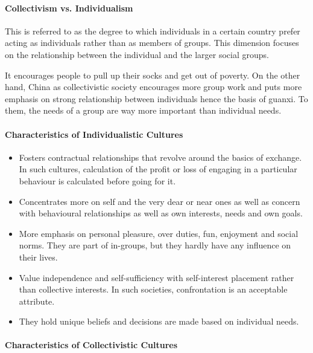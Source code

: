 \paragraph{Collectivism vs. Individualism}
This is referred to as the degree to which individuals in a certain country
prefer acting as individuals rather than as members of groups. This dimension
focuses on the relationship between the individual and the larger social
groups.

It encourages people to pull up their socks and get out of poverty. On the
other hand, China as collectivistic society encourages more group work and
puts more emphasis on strong relationship between individuals hence the basis
of guanxi. To them, the needs of a group are way more important than
individual needs.

\paragraph{Characteristics of Individualistic Cultures}

\begin{itemize}
    \item Fosters contractual relationships that revolve around the basics
        of exchange. In such cultures, calculation of the profit or loss
        of engaging in a particular behaviour is calculated before going
        for it.
    \item Concentrates more on self and the very dear or near ones as well as
        concern with behavioural relationships as well as own interests, needs
        and own goals.
    \item More emphasis on personal pleasure, over duties, fun, enjoyment and
        social norms. They are part of in-groups, but they hardly have any
        influence on their lives.
    \item Value independence and self-sufficiency with self-interest placement
        rather than collective interests. In such societies, confrontation is
        an acceptable attribute.
    \item They hold unique beliefs and decisions are made based on individual
        needs.
\end{itemize}

\paragraph{Characteristics of Collectivistic Cultures}

